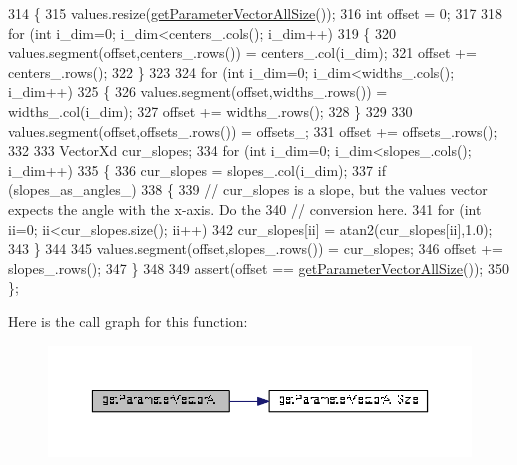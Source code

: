 \begin{DoxyCode}
314 \{
315   values.resize(\hyperlink{classDmpBbo_1_1ModelParametersLWR_ab24d2485b3b795b516f4844f225100eb}{getParameterVectorAllSize}());
316   \textcolor{keywordtype}{int} offset = 0;
317   
318   \textcolor{keywordflow}{for} (\textcolor{keywordtype}{int} i\_dim=0; i\_dim<centers\_.cols(); i\_dim++)
319   \{
320     values.segment(offset,centers\_.rows()) = centers\_.col(i\_dim);
321     offset += centers\_.rows();
322   \}
323   
324   \textcolor{keywordflow}{for} (\textcolor{keywordtype}{int} i\_dim=0; i\_dim<widths\_.cols(); i\_dim++)
325   \{
326     values.segment(offset,widths\_.rows()) = widths\_.col(i\_dim);
327     offset += widths\_.rows();
328   \}
329   
330   values.segment(offset,offsets\_.rows()) = offsets\_;
331   offset += offsets\_.rows();
332   
333   VectorXd cur\_slopes;
334   \textcolor{keywordflow}{for} (\textcolor{keywordtype}{int} i\_dim=0; i\_dim<slopes\_.cols(); i\_dim++)
335   \{
336     cur\_slopes = slopes\_.col(i\_dim);
337     \textcolor{keywordflow}{if} (slopes\_as\_angles\_)
338     \{
339       \textcolor{comment}{// cur\_slopes is a slope, but the values vector expects the angle with the x-axis. Do the }
340       \textcolor{comment}{// conversion here.}
341       \textcolor{keywordflow}{for} (\textcolor{keywordtype}{int} ii=0; ii<cur\_slopes.size(); ii++)
342         cur\_slopes[ii] = atan2(cur\_slopes[ii],1.0);
343     \}
344     
345     values.segment(offset,slopes\_.rows()) = cur\_slopes;
346     offset += slopes\_.rows();
347   \}
348   
349   assert(offset == \hyperlink{classDmpBbo_1_1ModelParametersLWR_ab24d2485b3b795b516f4844f225100eb}{getParameterVectorAllSize}());   
350 \};
\end{DoxyCode}


Here is the call graph for this function\+:
\nopagebreak
\begin{figure}[H]
\begin{center}
\leavevmode
\includegraphics[width=350pt]{classDmpBbo_1_1ModelParametersLWR_a29429ff2771d1e56cfba7250d38da4b1_cgraph}
\end{center}
\end{figure}


